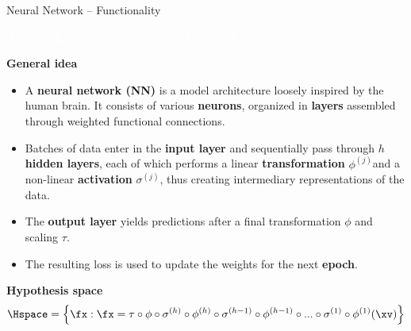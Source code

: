 \documentclass[11pt,compress,t,notes=noshow, xcolor=table]{beamer}
\newcommand{\maketag}[1]{\colorbox{highlightcol}{\textcolor{white}
{\MakeUppercase{#1}}}}
\newcommand{\highlight}[1]{\textcolor{highlightcol}{\textbf{#1}}}
\begin{document}
\begin{frame}{Neural Network -- Functionality}

\footnotesize

\maketag{|UN| SUPERVISED}
\maketag{|Non| parametric}
\maketag{BLACK-BOX}

\medskip

\highlight{General idea}
\begin{itemize}
  \item A \textbf{neural network (NN)} is a model architecture loosely inspired by 
  the human brain. It consists of various \textbf{neurons}, organized in 
  \textbf{layers} assembled through weighted functional connections. 
  \item Batches of data enter in the \textbf{input layer} and sequentially pass 
  through $h$ \textbf{hidden layers}, each of which performs a linear 
  \textbf{transformation} $\phi^{(j)}$and a non-linear \textbf{activation} 
  $\sigma^{(j)}$, thus creating intermediary representations of the data.
  \item The \textbf{output layer} yields predictions after a final transformation $\phi $ and 
  scaling $\tau$.
  \item The resulting loss is used to update the weights for the next 
  \textbf{epoch}.
\end{itemize}

\medskip
 
\highlight{Hypothesis space} ~~
$$\Hspace = \left\{ \fx: \fx = \tau \circ \phi \circ \sigma^{(h)} \circ
\phi^{(h)} \circ \sigma^{(h - 1)} \circ \phi^{(h - 1)} \circ ... \circ 
\sigma^{(1)} \circ \phi^{(1)} (\xv) \right\}$$

\medskip


\end{frame}
\end{document}
